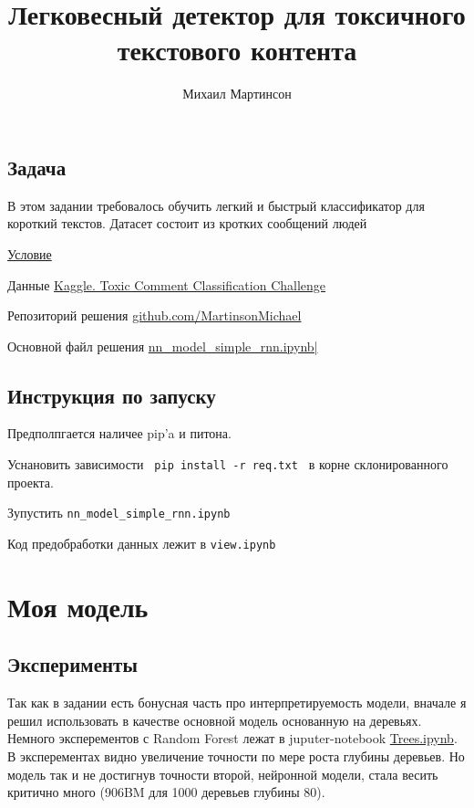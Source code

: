 \documentclass[13pt,a4paper]{article}
\title{Легковесный детектор для токсичного текстового контента}
\author{Михаил Мартинсон}
\theoremstyle{remark}
\begin{document}
	\maketitle
	
	\label{firstpage}
	
	\subsection*{Задача}
	
	В этом задании требовалось обучить легкий и быстрый классификатор для короткий текстов. Датасет состоит из кротких сообщений людей
	
	
	\href{https://github.com/MartinsonMichael/VK_Lab_intro/blob/master/%D0%9F%D1%80%D0%B8%D0%BA%D0%BB%D0%B0%D0%B4%D0%BD%D1%8B%D0%B5%20%D0%B8%D1%81%D1%81%D0%BB%D0%B5%D0%B4%D0%BE%D0%B2%D0%B0%D0%BD%D0%B8%D1%8F%20.pdf}{Условие}
		
	Данные \href{https://www.kaggle.com/c/jigsaw-toxic-comment-classification-challenge/overview}{Kaggle. Toxic Comment Classification Challenge}
	
	Репозиторий решения \href{https://github.com/MartinsonMichael/VK_Lab_intro}{github.com/MartinsonMichael}
		
	Основной файл решения \href{https://github.com/MartinsonMichael/VK_Lab_intro/blob/master/nn_model_simple_rnn.ipynb}{nn\_model\_simple\_rnn.ipynb|}

	\subsection*{Инструкция по запуску}
	
	Предполпгается наличее pip'a и питона. 
	
	Уснановить зависимости \verb| pip install -r req.txt | в корне склонированного проекта.
	
	Зупустить \verb|nn_model_simple_rnn.ipynb| 
	
	Код предобработки данных лежит в \verb|view.ipynb|
	
	
	\section{Моя модель}
	
	\subsection*{Эксперименты}
	
	Так как в задании есть бонусная часть про интерпретируемость модели, вначале я решил использовать в качестве основной модель основанную на деревьях. Немного эксперементов с Random Forest лежат в juputer-notebook
	\href{https://github.com/MartinsonMichael/VK_Lab_intro/blob/master/Trees.ipynb}{Trees.ipynb}. В эксперементах видно увеличение точности по мере роста глубины деревьев. Но модель так и не достигнув точности второй, нейронной модели, стала весить критично много (906BM для 1000 деревьев глубины 80).
	
\end{document}
